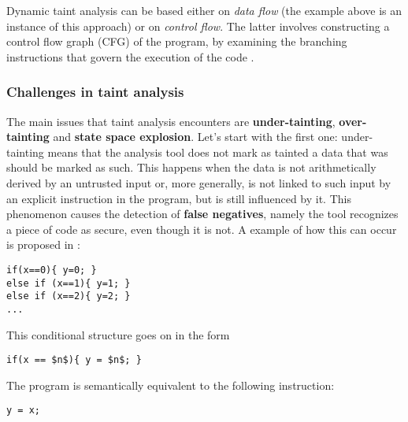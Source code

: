 \documentclass[target=mst,aauheader=aics]{thud}
\theoremstyle{definition}
\begin{document}
	Dynamic taint analysis can be based either on \textit{data flow} (the example above is an instance of this approach) or on \textit{control flow}. The latter involves constructing a control flow graph (CFG) of the program, by examining the branching instructions that govern the execution of the code \cite{Dai2018}.
	
	\subsubsection{Challenges in taint analysis}
	The main issues that taint analysis encounters are \textbf{under-tainting}, \textbf{over-tainting} and \textbf{state space explosion}. Let's start with the first one: under-tainting means that the analysis tool does not mark as tainted a data that was should be marked as such. This happens when the data is not arithmetically derived by an untrusted input or, more generally, is not linked to such input by an explicit instruction in the program, but is still influenced by it. This phenomenon causes the detection of \textbf{false negatives}, namely the tool recognizes a piece of code as secure, even though it is not. A example of how this can occur is proposed in \cite{Newsome2005}:
	
	\vspace{3mm}
	\begin{minipage}{.4\textwidth}
	\begin{lstlisting}
if(x==0){ y=0; } 
else if (x==1){ y=1; } 
else if (x==2){ y=2; } 
...
	\end{lstlisting}
	\end{minipage}

	This conditional structure goes on in the form
	
	\vspace{3mm}
	\begin{minipage}{.3\textwidth}
	\begin{lstlisting}[mathescape=true]
if(x == $n$){ y = $n$; }
	\end{lstlisting}
	\end{minipage}

	The program is semantically equivalent to the following instruction:
	
	\vspace{3mm}
	\begin{minipage}{.15\textwidth}
	\begin{lstlisting}
y = x;
	\end{lstlisting}
	\end{minipage}
\end{document}
